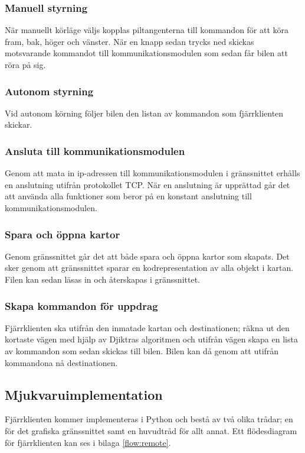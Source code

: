 \documentclass[tekniskrapport/tech.tex]{subfiles}
\begin{document}
\subsubsection{Manuell styrning}
När manuellt körläge väljs kopplas piltangenterna till kommandon för att köra
fram, bak, höger och vänster. När en knapp sedan trycks ned skickas motsvarande
kommandot till kommunikationsmodulen som sedan får bilen att röra på sig.

\subsubsection{Autonom styrning}
Vid autonom körning följer bilen den listan av kommandon som fjärrklienten
skickar.

\subsubsection{Ansluta till kommunikationsmodulen}
Genom att mata in ip-adressen till kommunikationsmodulen i gränssnittet erhålls
en anslutning utifrån protokollet TCP. När en anslutning är upprättad går det
att använda alla funktioner som beror på en konstant anslutning till
kommunikationsmodulen.

\subsubsection{Spara och öppna kartor}
Genom gränssnittet går det att både spara och öppna kartor som skapats. Det
sker genom att gränssnittet sparar en kodrepresentation av alla objekt i
kartan. Filen kan sedan läsas in och återskapas i gränssnittet.

\subsubsection{Skapa kommandon för uppdrag}
Fjärrklienten ska utifrån den inmatade kartan och destinationen; räkna ut den
kortaste vägen med hjälp av Djiktras algoritmen och utifrån vägen skapa en
lista av kommandon som sedan skickas till bilen. Bilen kan då genom att utifrån
kommandona nå destinationen.

\subsection{Mjukvaruimplementation}
Fjärrklienten kommer implementeras i Python och bestå av två olika trådar; en
för det grafiska gränssnittet samt en huvudtråd för allt annat. Ett
flödesdiagram för fjärrklienten kan ses i bilaga \ref{flow:remote}.
\end{document}
